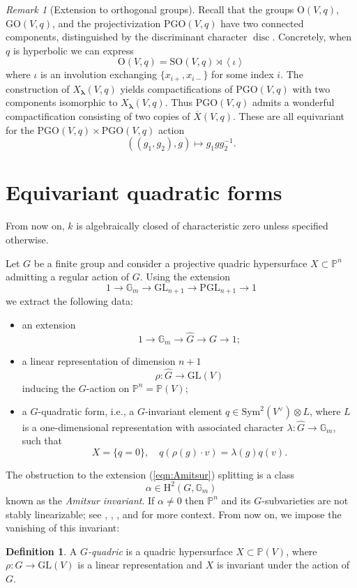 \documentclass[12pt]{amsart}
\numberwithin{equation}{section}
\newcommand{\ra}{\rightarrow}
\newcommand{\blambda}{\boldsymbol{\lambda}}
\newcommand{\bG}{\mathbb{G}}
\newcommand{\bP}{\mathbb{P}}
\newcommand{\rH}{\mathrm{H}}
\newcommand{\oX}{\overline{X}}
\newcommand{\wG}{\widehat{G}}
\newcommand{\disc}{\operatorname{disc}}
\newcommand{\GL}{\mathrm{GL}}
\newcommand{\GO}{\mathrm{GO}}
\newcommand{\OO}{\mathrm{O}}
\newcommand{\PGL}{\mathrm{PGL}}
\newcommand{\PGO}{\mathrm{PGO}}
\newcommand{\SO}{\mathrm{SO}}
\newcommand{\Sym}{\mathrm{Sym}}
\theoremstyle{plain}
\theoremstyle{definition}
\newtheorem{defi}[prop]{Definition}
\theoremstyle{remark}
\newtheorem{rema}[prop]{Remark}
\begin{document}
\begin{rema}[Extension to orthogonal groups]
\label{rema:EOG}
Recall that the groups $\OO(V,q)$, $\GO(V,q)$, and the
projectivization $\PGO(V,q)$
have two connected components, distinguished by the
discriminant character $\disc$. 
Concretely, when $q$ is hyperbolic we can express
$$\OO(V,q) = \SO(V,q) \rtimes \left<\iota\right>$$
where $\iota$ is an involution exchanging $\{x_{i+},x_{i-}\}$
for some index $i$.  
The construction of $X_{\blambda}(V,q)$ yields compactifications of $\PGO(V,q)$ with two components isomorphic to $X_{\blambda}(V,q)$.
Thus $\PGO(V,q)$ admits a wonderful compactification 
consisting of two copies of $\oX(V,q)$. 
These are all equivariant for the $\PGO(V,q)\times \PGO(V,q)$
action 
$$((g_1,g_2),g) \mapsto g_1gg_2^{-1}.$$
\end{rema}



\section{Equivariant quadratic forms}
\label{sect:equiv-quad}

From now on, $k$ is algebraically closed of characteristic zero
unless specified otherwise.

Let $G$ be a finite group and consider a projective quadric hypersurface $X \subset \bP^n$ 
admitting a regular action of $G$.  
Using the extension
$$ 1 \rightarrow \bG_m \rightarrow \GL_{n+1} \rightarrow \PGL_{n+1} \rightarrow 1$$
we extract the following data:
\begin{itemize}
\item{an extension 
\begin{equation} \label{eqn:Amitsur} 1 \rightarrow \bG_m \rightarrow \wG \rightarrow G \rightarrow 1; \end{equation}}
\item{a linear representation of dimension $n+1$
$$\rho:\wG \rightarrow \GL(V)$$ 
inducing the $G$-action on $\bP^n=\bP(V)$;}
\item{a $G$-quadratic form, i.e., a $G$-invariant element $q \in \Sym^2(V^{\vee})\otimes L$, where $L$ is a one-dimensional
representation with associated character $\lambda:\wG\ra \bG_m$, such that
$$X= \{q=0\}, \quad
q(\rho(g)\cdot v)=\lambda(g) q(v).
$$
}
\end{itemize}
The obstruction to the extension (\ref{eqn:Amitsur}) splitting is a class
$$\alpha \in \rH^2(G,\bG_m)$$
known as the {\em Amitsur invariant}. If $\alpha\neq 0$ then $\bP^n$ and its $G$-subvarieties are not stably linearizable;
see \cite[\S 2]{BP}, \cite[App.A]{BCDP}, \cite[\S 2]{HTPAMQ}, and \cite[\S 3.5]{HTNagoya} for more context.
From now on, we impose the vanishing of this invariant:
\begin{defi}
A {\em $G$-quadric} is a quadric hypersurface $X\subset \bP(V)$,
where $\rho:G \ra \GL(V)$ is a linear representation and 
$X$ is invariant under the action of $G$.
\end{defi}
\end{document}
